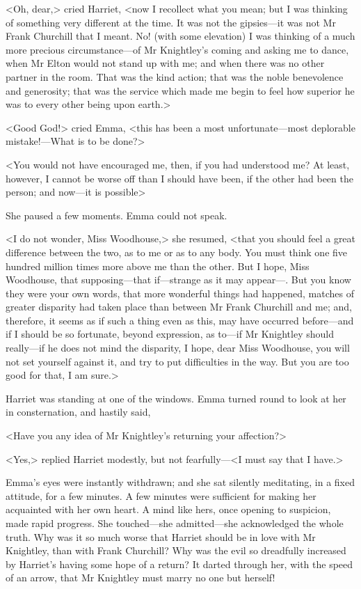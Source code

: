 <Oh, dear,> cried Harriet, <now I recollect what you mean; but I was thinking of something very different at the time. It was not the gipsies—it was not Mr Frank Churchill that I meant. No! (with some elevation) I was thinking of a much more precious circumstance—of Mr Knightley's coming and asking me to dance, when Mr Elton would not stand up with me; and when there was no other partner in the room. That was the kind action; that was the noble benevolence and generosity; that was the service which made me begin to feel how superior he was to every other being upon earth.>

<Good God!> cried Emma, <this has been a most unfortunate—most deplorable mistake!—What is to be done?>

<You would not have encouraged me, then, if you had understood me? At least, however, I cannot be worse off than I should have been, if the other had been the person; and now—it is possible\longdash>

She paused a few moments. Emma could not speak.

<I do not wonder, Miss Woodhouse,> she resumed, <that you should feel a great difference between the two, as to me or as to any body. You must think one five hundred million times more above me than the other. But I hope, Miss Woodhouse, that supposing—that if—strange as it may appear—. But you know they were your own words, that more wonderful things had happened, matches of greater disparity had taken place than between Mr Frank Churchill and me; and, therefore, it seems as if such a thing even as this, may have occurred before—and if I should be so fortunate, beyond expression, as to—if Mr Knightley should really—if he does not mind the disparity, I hope, dear Miss Woodhouse, you will not set yourself against it, and try to put difficulties in the way. But you are too good for that, I am sure.>

Harriet was standing at one of the windows. Emma turned round to look at her in consternation, and hastily said,

<Have you any idea of Mr Knightley's returning your affection?>

<Yes,> replied Harriet modestly, but not fearfully—<I must say that I have.>

Emma's eyes were instantly withdrawn; and she sat silently meditating, in a fixed attitude, for a few minutes. A few minutes were sufficient for making her acquainted with her own heart. A mind like hers, once opening to suspicion, made rapid progress. She touched—she admitted—she acknowledged the whole truth. Why was it so much worse that Harriet should be in love with Mr Knightley, than with Frank Churchill? Why was the evil so dreadfully increased by Harriet's having some hope of a return? It darted through her, with the speed of an arrow, that Mr Knightley must marry no one but herself!

